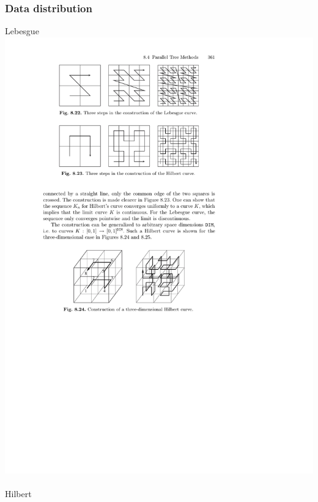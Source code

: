 \documentclass[mathserif]{beamer}
\begin{document}
\begin{frame}
    \frametitle{Data distribution}
    \begin{minipage}[b]{0.40\linewidth}
	Lebesgue
	\includegraphics[viewport = 105 705 375 795, scale=0.6, clip]{figures/hilbertCurve.pdf}
	\ \\
	Hilbert

\end{minipage}
\end{frame}
\end{document}
